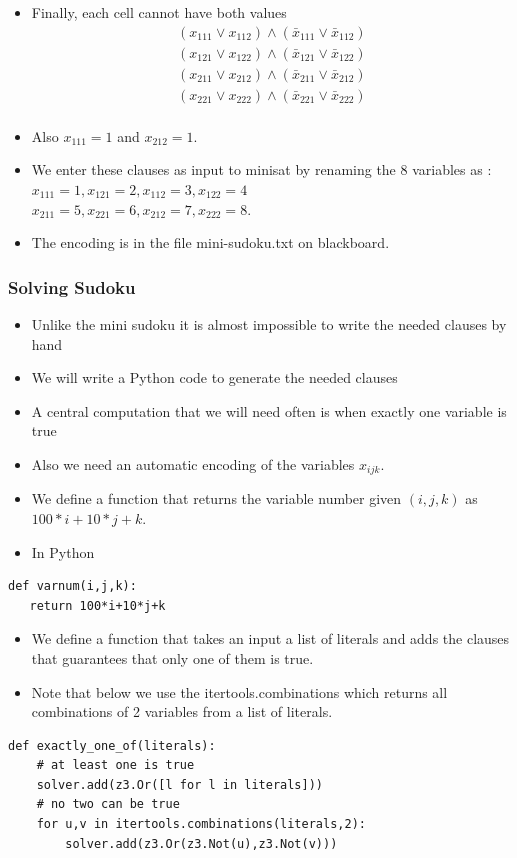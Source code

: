 \documentclass{beamer}
\begin{document}
\begin{frame}
  \begin{itemize}
  \item Finally, each cell cannot have both values
    \begin{align*}
      (x_{111}\vee x_{112})\wedge (\bar{x}_{111}\vee \bar{x}_{112})\\
      (x_{121}\vee x_{122})\wedge (\bar{x}_{121}\vee \bar{x}_{122})\\
      (x_{211}\vee x_{212})\wedge (\bar{x}_{211}\vee \bar{x}_{212})\\
      (x_{221}\vee x_{222})\wedge (\bar{x}_{221}\vee \bar{x}_{222})\\
    \end{align*}
\item Also $x_{111}=1$ and $x_{212}=1$. 
\item We enter these clauses as input to minisat by renaming the 8 variables as : $x_{111}=1,x_{121}=2,x_{112}=3,x_{122}=4$\\
$x_{211}=5,x_{221}=6,x_{212}=7,x_{222}=8$.
\item The encoding is in the file mini-sudoku.txt on blackboard.
  \end{itemize}
\end{frame}
\begin{frame}[fragile]
  \frametitle{Solving Sudoku}
  \begin{itemize}
  \item Unlike the mini sudoku it is almost impossible to write the needed clauses by hand
  \item We will write a Python code to generate the needed clauses
  \item A central computation that we will need often is when exactly one variable is true
  \item Also we need an automatic encoding of the variables $x_{ijk}$.
  \item We define a function that returns the variable number given $(i,j,k)$ as $100*i+10*j+k$.
  \item In Python
\end{itemize}
\begin{lstlisting}[numbers=none]
def varnum(i,j,k):
   return 100*i+10*j+k
\end{lstlisting}

\end{frame}
\begin{frame}[fragile]
  \begin{itemize}
  \item We define a function that takes an input a list of literals and adds the clauses that guarantees that only one of them is true.
\item Note that below we use the itertools.combinations which returns all combinations of 2 variables from a list of literals.
  \end{itemize}
\begin{lstlisting}[numbers=none]
def exactly_one_of(literals):
    # at least one is true
    solver.add(z3.Or([l for l in literals]))
    # no two can be true
    for u,v in itertools.combinations(literals,2):
        solver.add(z3.Or(z3.Not(u),z3.Not(v)))
\end{lstlisting}
\end{frame}
\end{document}
